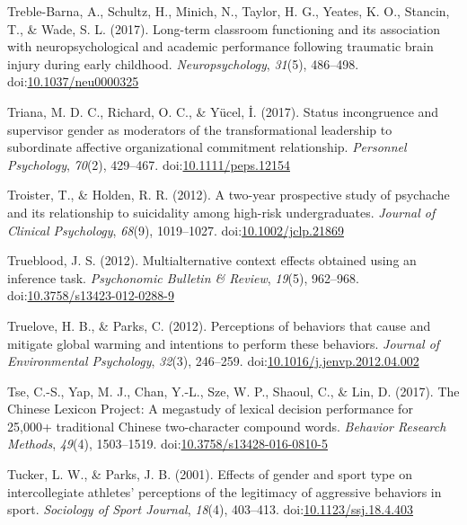\documentclass[english,man]{apa6}
\begin{document}
\hypertarget{ref-Treble-barna2017}{}
Treble-Barna, A., Schultz, H., Minich, N., Taylor, H. G., Yeates, K. O.,
Stancin, T., \& Wade, S. L. (2017). Long-term classroom functioning and
its association with neuropsychological and academic performance
following traumatic brain injury during early childhood.
\emph{Neuropsychology}, \emph{31}(5), 486--498.
doi:\href{https://doi.org/10.1037/neu0000325}{10.1037/neu0000325}

\hypertarget{ref-Triana2017}{}
Triana, M. D. C., Richard, O. C., \& Yücel, İ. (2017). Status
incongruence and supervisor gender as moderators of the transformational
leadership to subordinate affective organizational commitment
relationship. \emph{Personnel Psychology}, \emph{70}(2), 429--467.
doi:\href{https://doi.org/10.1111/peps.12154}{10.1111/peps.12154}

\hypertarget{ref-Troister2012}{}
Troister, T., \& Holden, R. R. (2012). A two-year prospective study of
psychache and its relationship to suicidality among high-risk
undergraduates. \emph{Journal of Clinical Psychology}, \emph{68}(9),
1019--1027.
doi:\href{https://doi.org/10.1002/jclp.21869}{10.1002/jclp.21869}

\hypertarget{ref-Trueblood2012}{}
Trueblood, J. S. (2012). Multialternative context effects obtained using
an inference task. \emph{Psychonomic Bulletin \& Review}, \emph{19}(5),
962--968.
doi:\href{https://doi.org/10.3758/s13423-012-0288-9}{10.3758/s13423-012-0288-9}

\hypertarget{ref-Truelove2012}{}
Truelove, H. B., \& Parks, C. (2012). Perceptions of behaviors that
cause and mitigate global warming and intentions to perform these
behaviors. \emph{Journal of Environmental Psychology}, \emph{32}(3),
246--259.
doi:\href{https://doi.org/10.1016/j.jenvp.2012.04.002}{10.1016/j.jenvp.2012.04.002}

\hypertarget{ref-Tse2017}{}
Tse, C.-S., Yap, M. J., Chan, Y.-L., Sze, W. P., Shaoul, C., \& Lin, D.
(2017). The Chinese Lexicon Project: A megastudy of lexical decision
performance for 25,000+ traditional Chinese two-character compound
words. \emph{Behavior Research Methods}, \emph{49}(4), 1503--1519.
doi:\href{https://doi.org/10.3758/s13428-016-0810-5}{10.3758/s13428-016-0810-5}

\hypertarget{ref-Tucker2001}{}
Tucker, L. W., \& Parks, J. B. (2001). Effects of gender and sport type
on intercollegiate athletes' perceptions of the legitimacy of aggressive
behaviors in sport. \emph{Sociology of Sport Journal}, \emph{18}(4),
403--413.
doi:\href{https://doi.org/10.1123/ssj.18.4.403}{10.1123/ssj.18.4.403}
\end{document}
